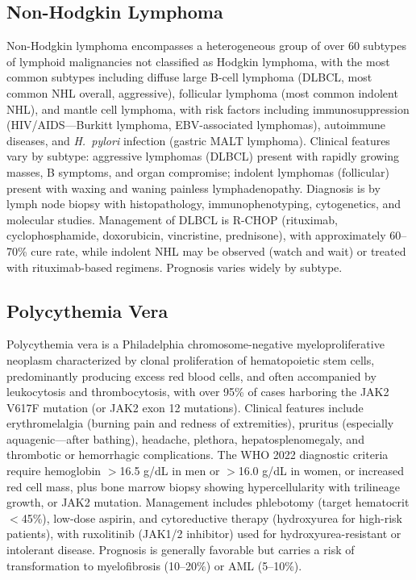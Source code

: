 \subsection{Non-Hodgkin Lymphoma}
\label{sec:Non-Hodgkin Lymphoma}
Non-Hodgkin lymphoma encompasses a heterogeneous group of over 60 subtypes of lymphoid malignancies not classified as Hodgkin lymphoma, with the most common subtypes including diffuse large B-cell lymphoma (DLBCL, most common NHL overall, aggressive), follicular lymphoma (most common indolent NHL), and mantle cell lymphoma, with risk factors including immunosuppression (HIV/AIDS---Burkitt lymphoma, EBV-associated lymphomas), autoimmune diseases, and \textit{H.~pylori} infection (gastric MALT lymphoma). Clinical features vary by subtype: aggressive lymphomas (DLBCL) present with rapidly growing masses, B symptoms, and organ compromise; indolent lymphomas (follicular) present with waxing and waning painless lymphadenopathy. Diagnosis is by lymph node biopsy with histopathology, immunophenotyping, cytogenetics, and molecular studies. Management of DLBCL is R-CHOP (rituximab, cyclophosphamide, doxorubicin, vincristine, prednisone), with approximately 60--70\% cure rate, while indolent NHL may be observed (watch and wait) or treated with rituximab-based regimens. Prognosis varies widely by subtype.

\subsection{Polycythemia Vera}
\label{sec:Polycythemia Vera}
Polycythemia vera is a Philadelphia chromosome-negative myeloproliferative neoplasm characterized by clonal proliferation of hematopoietic stem cells, predominantly producing excess red blood cells, and often accompanied by leukocytosis and thrombocytosis, with over 95\% of cases harboring the JAK2 V617F mutation (or JAK2 exon 12 mutations). Clinical features include erythromelalgia (burning pain and redness of extremities), pruritus (especially aquagenic---after bathing), headache, plethora, hepatosplenomegaly, and thrombotic or hemorrhagic complications. The WHO 2022 diagnostic criteria require hemoglobin $>$16.5 g/dL in men or $>$16.0 g/dL in women, or increased red cell mass, plus bone marrow biopsy showing hypercellularity with trilineage growth, or JAK2 mutation. Management includes phlebotomy (target hematocrit $<$45\%), low-dose aspirin, and cytoreductive therapy (hydroxyurea for high-risk patients), with ruxolitinib (JAK1/2 inhibitor) used for hydroxyurea-resistant or intolerant disease. Prognosis is generally favorable but carries a risk of transformation to myelofibrosis (10--20\%) or AML (5--10\%).

